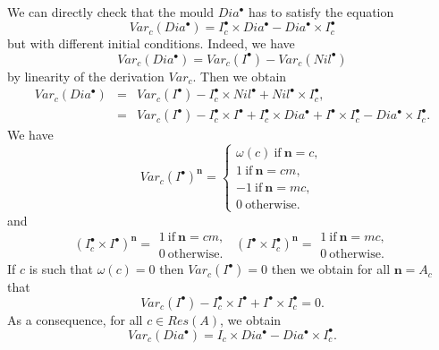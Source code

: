 \documentclass[english,11pt]{amsart}
\def\nn{\mathbf{n}}
\def\nn{\mathbf{n}}
\begin{document}
We can directly check that the mould $Dia^{\bullet}$ has to satisfy the equation
    \begin{equation}
        Var_c (Dia^{\bullet} ) =I_c^{\bullet} \times Dia^{\bullet} -Dia^{\bullet} \times I_c^{\bullet} 
    \end{equation}
but with different initial conditions. Indeed, we have 
    \begin{equation}
        Var_c (Dia^{\bullet} ) =Var_c (I^{\bullet} ) -Var_c (Nil^{\bullet} ) 
    \end{equation}
by linearity of the derivation $Var_c$. Then we obtain
\begin{equation}
\left .
\begin{array}{lll}
        Var_c (Dia^{\bullet} ) & = & Var_c (I^{\bullet} )- I_c^{\bullet} \times Nil^{\bullet} +Nil^{\bullet} \times I_c^{\bullet} ,\\
         & = & Var_c (I^{\bullet} ) - I_c^{\bullet} \times I^{\bullet} + I_c^{\bullet} \times Dia^{\bullet} +I^{\bullet} \times I_c^{\bullet} - Dia^{\bullet} \times  I_c^{\bullet} .
\end{array}
\right .
\end{equation}
We have 
\begin{equation}
    Var_c (I^{\bullet} )^{\nn} =\left \{ 
    \begin{array}{l}
    \omega (c)  \ \mbox{if}\ \nn =c ,\\
    1 \ \mbox{if}\ \nn =cm ,\\
    -1 \ \mbox{if}\ \nn = mc ,\\
    0\ \mbox{otherwise.}
    \end{array}
    \right .
\end{equation}
and 
\begin{equation}
    (I_c^{\bullet} \times I^{\bullet} )^{\nn}=
    \left .
    \begin{array}{l}
    1\ \mbox{if}\ \nn =cm ,\\
    0 \ \mbox{otherwise.}
    \end{array}
    \right .
\ \     
    (I^{\bullet} \times I_c^{\bullet})^{\nn} =
    \left .
    \begin{array}{l}
    1\ \mbox{if}\ \nn =mc ,\\
    0 \ \mbox{otherwise.}
    \end{array}
    \right .
\end{equation}
If $c$ is such that $\omega (c)=0$ then $Var_c (I^{\bullet} )=0$ then we obtain for all $\nn =A_c$ that 
\begin{equation}
    Var_c (I^{\bullet} ) - I_c^{\bullet} \times I^{\bullet} +I^{\bullet} \times I_c^{\bullet}
    = 0 .
\end{equation}
As a consequence, for all $c\in Res (A)$, we obtain 
\begin{equation}
    Var_c (Dia^{\bullet} )=I_c \times Dia^{\bullet} -Dia^{\bullet}\times I_c^{\bullet} . 
\end{equation}
\end{document}
